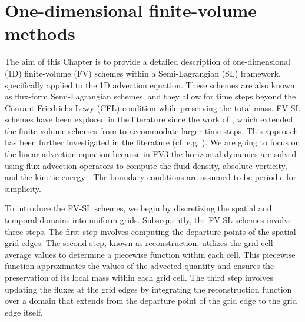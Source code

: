 \chapter{One-dimensional finite-volume methods}
\label{chp-1d-fv}

\theoremstyle{plain}
\newtheorem{lema}{Lemma}[chapter]

\theoremstyle{plain}
\newtheorem{prop}{Proposition}[chapter]

\theoremstyle{plain}
\newtheorem{thrm}{Theorem}[chapter]

\theoremstyle{plain}
\newtheorem{remark}{Remark}[chapter]

\theoremstyle{plain}
\newtheorem{corollary}{Corollary}[chapter]

\theoremstyle{plain}
\newtheorem{definition}{Definition}[chapter]


The aim of this Chapter is to provide a detailed description of one-dimensional (1D) 
finite-volume (FV) schemes within a Semi-Lagrangian (SL) framework, specifically applied to 
the 1D advection equation.
These schemes are also known as flux-form Semi-Lagrangian schemes, and they allow for time steps beyond the 
Courant-Friedrichs-Lewy (CFL) condition while preserving the total mass.
FV-SL schemes have been explored in the literature since the work of  \citet{leveque:1985},
which extended the finite-volume schemes from \citet{godunov:1959}  to accommodate larger time steps.
This approach has been further investigated in the literature (cf. e.g. \citet{lin:1996,leonard:1996}).
We are going to focus on the linear advection equation because in FV3 the horizontal dynamics
are solved using flux advection operators to compute the fluid density, absolute vorticity, 
and the kinetic energy \citep{lin:1997,putmanthesis:2007, harris:2013, harris:2021}.
The boundary conditions are assumed to be periodic for simplicity.

To introduce the FV-SL schemes, we begin by discretizing the spatial and temporal domains into uniform grids.
Subsequently, the FV-SL schemes involve three steps.
The first step involves computing the departure points of the spatial grid edges.
The second step, known as reconstruction, utilizes the grid cell average values to
determine a piecewise function within each cell. This piecewise function approximates the
values of the advected quantity and ensures the preservation of its local mass within each grid cell.
The third step involves updating the fluxes at the grid edges by integrating the reconstruction function 
over a domain that extends from the departure point of the grid edge to the grid edge itself.

